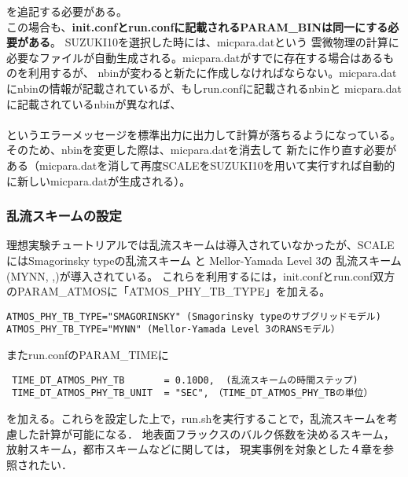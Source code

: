 を追記する必要がある。\\
この場合も、{\bf init.confとrun.confに記載されるPARAM\_BINは同一にする必要がある}。
SUZUKI10を選択した時には、micpara.datという
雲微物理の計算に必要なファイルが自動生成される。micpara.datがすでに存在する場合はあるものを利用するが、
nbinが変わると新たに作成しなければならない。micpara.datにnbinの情報が記載されているが、もしrun.confに記載されるnbinと
micpara.datに記載されているnbinが異なれば、\\

\\

\noindent というエラーメッセージを標準出力に出力して計算が落ちるようになっている。
そのため、nbinを変更した際は、micpara.datを消去して
新たに作り直す必要がある（micpara.datを消して再度SCALEをSUZUKI10を用いて実行すれば自動的に新しいmicpara.datが生成される）。


\subsubsection{乱流スキームの設定} \label{sec:adv_turbulence}
理想実験チュートリアルでは乱流スキームは導入されていなかったが、SCALEにはSmagorinsky typeの乱流スキーム
\citep{smagorinsky_1963, lilly_1962, Brown_etal_1994, Scotti_1993}と
Mellor-Yamada Level 3の
乱流スキーム(MYNN, \cite{my_1982},\cite{nakanishi_2004})が導入されている。
これらを利用するには，init.confとrun.conf双方のPARAM\_ATMOSに「ATMOS\_PHY\_TB\_TYPE」を加える。

\begin{verbatim}
ATMOS_PHY_TB_TYPE="SMAGORINSKY" (Smagorinsky typeのサブグリッドモデル)
ATMOS_PHY_TB_TYPE="MYNN" (Mellor-Yamada Level 3のRANSモデル）
\end{verbatim}

またrun.confのPARAM\_TIMEに

\begin{verbatim}
 TIME_DT_ATMOS_PHY_TB       = 0.10D0,  (乱流スキームの時間ステップ)
 TIME_DT_ATMOS_PHY_TB_UNIT  = "SEC",　（TIME_DT_ATMOS_PHY_TBの単位）
\end{verbatim}

を加える。これらを設定した上で，run.shを実行することで，乱流スキームを考慮した計算が可能になる．
地表面フラックスのバルク係数を決めるスキーム，放射スキーム，都市スキームなどに関しては，
現実事例を対象とした４章を参照されたい．


